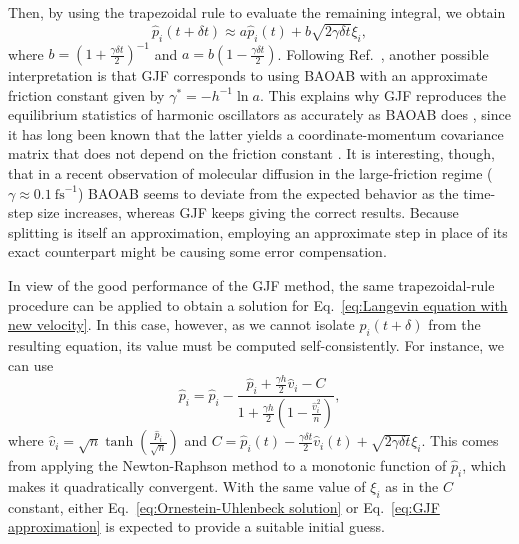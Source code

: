 \documentclass[
aip,
jcp,
reprint,
]{revtex4-1}
\newcommand{\timestep}{h}
\begin{document}
Then, by using the trapezoidal rule to evaluate the remaining integral, we obtain
\begin{equation}
\label{eq:GJF approximation}
\hat{p}_i(t+\delta t) \approx a \hat{p}_i(t) + b \sqrt{2 \gamma \delta t} \xi_i,
\end{equation}
where $b = (1 + \tfrac{\gamma \delta t}{2})^{-1}$ and $a = b (1 - \tfrac{\gamma \delta t}{2})$.
Following Ref.~, another possible interpretation is that GJF corresponds to using BAOAB with an approximate friction constant given by $\gamma^\ast = -\timestep^{-1} \ln a$.
This explains why GJF reproduces the equilibrium statistics of harmonic oscillators as accurately as BAOAB does \cite{Jensen_2019, Farago_2019, Finkelstein_2019}, since it has long been known that the latter yields a coordinate-momentum covariance matrix that does not depend on the friction constant \cite{Leimkuhler_2013_2}.
It is interesting, though, that in a recent observation of molecular diffusion in the large-friction regime ($\gamma \approx  0.1~\mathrm{fs}^{-1}$) BAOAB seems to deviate from the expected behavior as the time-step size increases, whereas GJF keeps giving the correct results.
Because splitting is itself an approximation, employing an approximate step in place of its exact counterpart might be causing some error compensation.

In view of the good performance of the GJF method, the same trapezoidal-rule procedure can be applied to obtain a solution for Eq.~\eqref{eq:Langevin equation with new velocity}.
In this case, however, as we cannot isolate $p_i(t+\delta)$ from the resulting equation, its value must be computed self-consistently.
For instance, we can use
\begin{equation}
\hat{p}_i = \hat{p}_i - \frac{\hat{p}_i + \frac{\gamma \timestep}{2} \hat{v}_i - C}{1 + \frac{\gamma \timestep}{2} \left(1 - \frac{\hat{v}_i^2}{n} \right)},
\end{equation}
where $\hat{v}_i = \sqrt{n} \tanh\left(\frac{\hat{p}_i}{\sqrt{n}}\right)$ and $C = \hat{p}_i(t) - \frac{\gamma \delta t}{2} \hat{v}_i(t) + \sqrt{2 \gamma \delta t} \xi_i$.
This comes from applying the Newton-Raphson method to a monotonic function of $\hat{p}_i$, which makes it quadratically convergent.
With the same value of $\xi_i$ as in the $C$ constant, either Eq.~\eqref{eq:Ornestein-Uhlenbeck solution} or Eq.~\eqref{eq:GJF approximation} is expected to provide a suitable initial guess.
\end{document}
